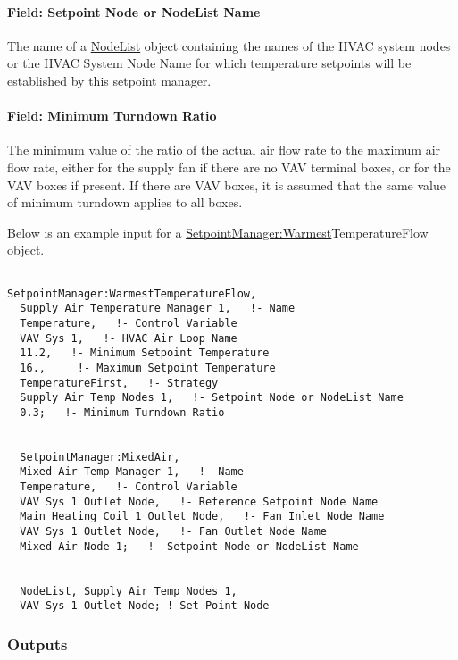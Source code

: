 \paragraph{Field: Setpoint Node or NodeList Name}\label{field-setpoint-node-or-nodelist-name-12}

The name of a \hyperref[nodelist]{NodeList} object containing the names of the HVAC system nodes or the HVAC System Node Name for which temperature setpoints will be established by this setpoint manager.

\paragraph{Field: Minimum Turndown Ratio}\label{field-minimum-turndown-ratio}

The minimum value of the ratio of the actual air flow rate to the maximum air flow rate, either for the supply fan if there are no VAV terminal boxes, or for the VAV boxes if present. If there are VAV boxes, it is assumed that the same value of minimum turndown applies to all boxes.

Below is an example input for a \hyperref[setpointmanagerwarmest]{SetpointManager:Warmest}TemperatureFlow object.

\begin{lstlisting}

SetpointManager:WarmestTemperatureFlow,
  Supply Air Temperature Manager 1,   !- Name
  Temperature,   !- Control Variable
  VAV Sys 1,   !- HVAC Air Loop Name
  11.2,   !- Minimum Setpoint Temperature
  16.,     !- Maximum Setpoint Temperature
  TemperatureFirst,   !- Strategy
  Supply Air Temp Nodes 1,   !- Setpoint Node or NodeList Name
  0.3;   !- Minimum Turndown Ratio


  SetpointManager:MixedAir,
  Mixed Air Temp Manager 1,   !- Name
  Temperature,   !- Control Variable
  VAV Sys 1 Outlet Node,   !- Reference Setpoint Node Name
  Main Heating Coil 1 Outlet Node,   !- Fan Inlet Node Name
  VAV Sys 1 Outlet Node,   !- Fan Outlet Node Name
  Mixed Air Node 1;   !- Setpoint Node or NodeList Name


  NodeList, Supply Air Temp Nodes 1,
  VAV Sys 1 Outlet Node; ! Set Point Node
\end{lstlisting}

\subsubsection{Outputs}\label{outputs-032}

